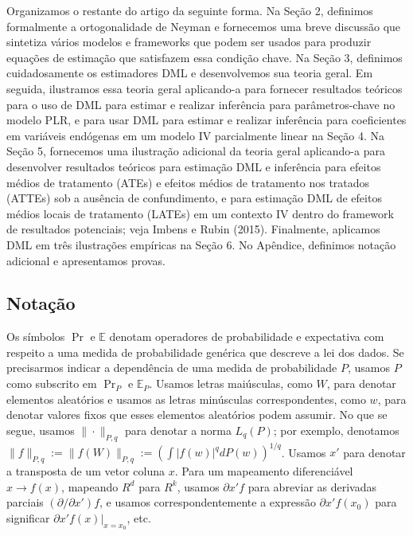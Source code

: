 \documentclass[a4paper,12pt]{article}[abntex2]
\begin{document}
Organizamos o restante do artigo da seguinte forma. Na Seção 2, definimos formalmente a ortogonalidade de Neyman e fornecemos uma breve discussão que sintetiza vários modelos e frameworks que podem ser usados para produzir equações de estimação que satisfazem essa condição chave. Na Seção 3, definimos cuidadosamente os estimadores DML e desenvolvemos sua teoria geral. Em seguida, ilustramos essa teoria geral aplicando-a para fornecer resultados teóricos para o uso de DML para estimar e realizar inferência para parâmetros-chave no modelo PLR, e para usar DML para estimar e realizar inferência para coeficientes em variáveis endógenas em um modelo IV parcialmente linear na Seção 4. Na Seção 5, fornecemos uma ilustração adicional da teoria geral aplicando-a para desenvolver resultados teóricos para estimação DML e inferência para efeitos médios de tratamento (ATEs) e efeitos médios de tratamento nos tratados (ATTEs) sob a ausência de confundimento, e para estimação DML de efeitos médios locais de tratamento (LATEs) em um contexto IV dentro do framework de resultados potenciais; veja Imbens e Rubin (2015). Finalmente, aplicamos DML em três ilustrações empíricas na Seção 6. No Apêndice, definimos notação adicional e apresentamos provas.

\subsection*{Notação}

Os símbolos $\Pr$ e $\mathbb{E}$ denotam operadores de probabilidade e expectativa com respeito a uma medida de probabilidade genérica que descreve a lei dos dados. Se precisarmos indicar a dependência de uma medida de probabilidade $P$, usamos $P$ como subscrito em $\Pr_P$ e $\mathbb{E}_P$. Usamos letras maiúsculas, como $W$, para denotar elementos aleatórios e usamos as letras minúsculas correspondentes, como $w$, para denotar valores fixos que esses elementos aleatórios podem assumir. No que se segue, usamos $\| \cdot \|_{P,q}$ para denotar a norma $L_q(P)$; por exemplo, denotamos $\|f \|_{P,q} := \|f(W) \|_{P,q} := \left(\int |f(w) |^q dP(w)\right)^{1/q}$. Usamos $x'$ para denotar a transposta de um vetor coluna $x$. Para um mapeamento diferenciável $x \rightarrow f(x)$, mapeando $R^d$ para $R^k$, usamos $\partial x' f$ para abreviar as derivadas parciais $(\partial / \partial x') f$, e usamos correspondentemente a expressão $\partial x' f(x_0)$ para significar $\partial x' f(x) |_{x = x_0}$, etc.

\newpage
\end{document}
